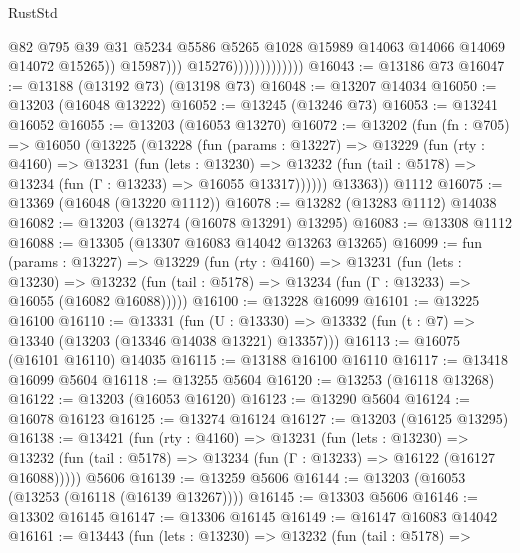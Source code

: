 \begin{lexlean}{RustStd}
\begin{coremodule}
                                        @82
                                        @795
                                        @39
                                        @31
                                        @5234
                                        @5586
                                        @5265
                                        @1028
                                        @15989
                                        @14063
                                        @14066
                                        @14069
                                        @14072
                                        @15265))
                                    @15987)))
                              @15276)))))))))))))
@16043 := @13186 @73
@16047 := @13188 (@13192 @73) (@13198 @73)
@16048 := @13207 @14034
@16050 := @13203 (@16048 @13222)
@16052 := @13245 (@13246 @73)
@16053 := @13241 @16052
@16055 := @13203 (@16053 @13270)
@16072 := @13202
    (fun (fn : @705) =>
    @16050
      (@13225
        (@13228
          (fun (params : @13227) =>
          @13229
            (fun (rty : @4160) =>
            @13231
              (fun (lets : @13230) =>
              @13232 (fun (tail : @5178) => @13234 (fun (Γ : @13233) => @16055 @13317))))))
        @13363))
    @1112
@16075 := @13369 (@16048 (@13220 @1112))
@16078 := @13282 (@13283 @1112) @14038
@16082 := @13203 (@13274 (@16078 @13291) @13295)
@16083 := @13308 @1112
@16088 := @13305 (@13307 @16083 @14042 @13263 @13265)
@16099 := fun (params : @13227) =>
  @13229
    (fun (rty : @4160) =>
    @13231
      (fun (lets : @13230) =>
      @13232 (fun (tail : @5178) => @13234 (fun (Γ : @13233) => @16055 (@16082 @16088)))))
@16100 := @13228 @16099
@16101 := @13225 @16100
@16110 := @13331
    (fun (U : @13330) => @13332 (fun (t : @7) => @13340 (@13203 (@13346 @14038 @13221) @13357)))
@16113 := @16075 (@16101 @16110) @14035
@16115 := @13188 @16100 @16110
@16117 := @13418 @16099 @5604
@16118 := @13255 @5604
@16120 := @13253 (@16118 @13268)
@16122 := @13203 (@16053 @16120)
@16123 := @13290 @5604
@16124 := @16078 @16123
@16125 := @13274 @16124
@16127 := @13203 (@16125 @13295)
@16138 := @13421
    (fun (rty : @4160) =>
    @13231
      (fun (lets : @13230) =>
      @13232 (fun (tail : @5178) => @13234 (fun (Γ : @13233) => @16122 (@16127 @16088)))))
    @5606
@16139 := @13259 @5606
@16144 := @13203 (@16053 (@13253 (@16118 (@16139 @13267))))
@16145 := @13303 @5606
@16146 := @13302 @16145
@16147 := @13306 @16145
@16149 := @16147 @16083 @14042
@16161 := @13443
    (fun (lets : @13230) =>
    @13232
      (fun (tail : @5178) =>

\end{coremodule}
\end{lexlean}

